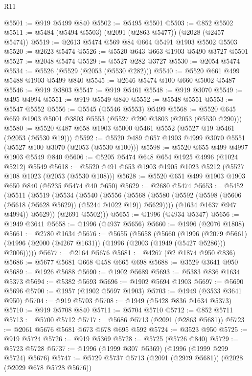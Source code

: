\begin{lexlean}{R11}
\begin{coremodule}
@5501 := @919 @5499 @840
@5502 := @5495 @5501
@5503 := @852 @5502
@5511 := @5484 (@5494 @5503) (@2091 (@2863 @5477)) (@2028 (@2457 @5474))
@5519 := @2613 @5474 @569 @84 @664 @5491 @1903 @5502 @5503
@5520 := @2623 @5474
@5526 := @5520 @643 @663 @1903 @5490 @3727 @5501
@5527 := @2048 @5474
@5529 := @5527 @282 @3727
@5530 := @2054 @5474
@5534 := @5526 (@5529 (@2053 (@5530 @282)))
@5540 := @5520 @661 @499 @5488 @1903 @5499 @840
@5545 := @2646 @5474 @100 @660 @5002 @5487
@5546 := @919 @3803
@5547 := @919 @5461
@5548 := @919 @3070
@5549 := @495 @4994
@5551 := @919 @5549 @840
@5552 := @5548 @5551
@5553 := @5547 @5552
@5556 := @5545 (@5546 @5553) @5499
@5568 := @5520 @645 @659 @1903 @5001 @3803 @5553 (@5527 @290 @3803 (@2053 (@5530 @290)))
@5580 := @5520 @487 @658 @1903 @5000 @5461 @5552 (@5527 @19 @5461 (@2053 (@5530 @19)))
@5592 := @5520 @489 @657 @1903 @4999 @3070 @5551 (@5527 @100 @3070 (@2053 (@5530 @100)))
@5598 := @5520 @655 @499 @4997 @1903 @5549 @840
@5606 := @5205 @5474 @648 @654 @1925 @4996 (@1024 @5212) @5549
@5618 := @5520 @491 @653 @1903 @1905 @1023 @5212 (@5527 @108 @1023 (@2053 (@5530 @108)))
@5628 := @5520 @651 @499 @1903 @1903 @650 @840 (@5235 @5474 @40 @650)
@5629 := @2680 @5474
@5653 := @5452
    (@5511
      (@5519
        (@5534
          (@5540
            (@5556
              (@5568 (@5580 (@5592 (@5598 (@5606 (@5618 (@5628 @5629)) (@5244 @1022 @19)) @5629))))
              (@1634 @1637 @947 @4994))
            @5629))
        (@2691 @5502)))
@5655 := @1996 (@4934 @5347)
@5656 := @1949 @3641
@5658 := @1996 (@4937 @5656)
@5660 := @1996 (@2076 @1808)
@5661 := @2780 @1634
@5676 := @5655
    (@5658
      (@5660
        (@1996
          (@2079 @5661)
          (@1996 (@2000 (@4267 @1631)) (@1996 (@2003 (@1949 (@5427 @5286))) @2006)))))
@5677 := @2164 @5676
@5681 := @4267 (@2 @1874 @950 @836)
@5686 := @5677 @5681 @668 @458 @665 @698
@5688 := @3529 @3641 @950
@5689 := @1926 @5688
@5690 := @1902 @5689
@5693 := @5383 @836 @1634 @5373
@5694 := @5382 @5693
@5696 := @1902 @5694 @1903
@5697 := @5690 @5696
@5700 := @1957 (@1902 @5697 @1903)
@5703 := @1949 (@3533 @3641 @950)
@5704 := @919 @5703
@5708 := @1949 (@5428 @836 @1634 @5373)
@5710 := @919 @5708 @840
@5711 := @5704 @5710
@5712 := @852 @5711
@5713 := @5700 @5712
@5717 := @5686 @5713 (@2091 (@2863 @5681))
@5723 := @2061 @5676 @5681 @673 @678 @695 @592
@5724 := @3523 @950
@5725 := @919 @5724
@5726 := @919 @5369
@5728 := @5725 (@5726 @840)
@5729 := @5723 @5728
@5737 := @1996 (@1999 @307 @5369) (@1996 (@1999 @299 @5724) @5676)
@5747 := @5729 @5737 @5713 (@2091 (@2979 @5681)) (@2028 (@2029 @678 @5728 @5676))

\end{coremodule}
\end{lexlean}

